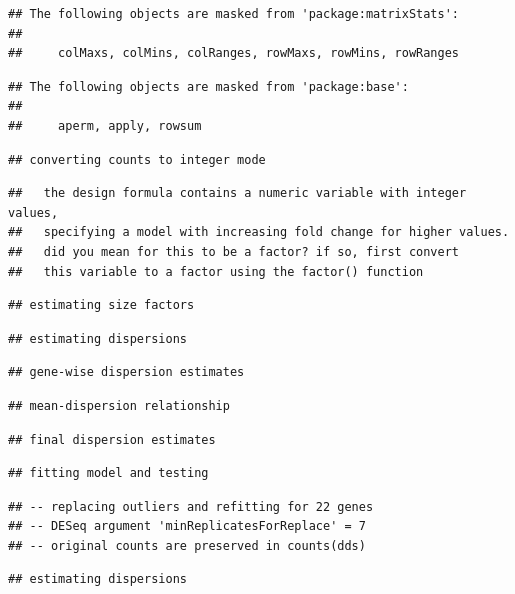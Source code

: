 \documentclass[]{article}
\begin{document}
\begin{verbatim}
## The following objects are masked from 'package:matrixStats':
## 
##     colMaxs, colMins, colRanges, rowMaxs, rowMins, rowRanges
\end{verbatim}

\begin{verbatim}
## The following objects are masked from 'package:base':
## 
##     aperm, apply, rowsum
\end{verbatim}

\begin{verbatim}
## converting counts to integer mode
\end{verbatim}

\begin{verbatim}
##   the design formula contains a numeric variable with integer values,
##   specifying a model with increasing fold change for higher values.
##   did you mean for this to be a factor? if so, first convert
##   this variable to a factor using the factor() function
\end{verbatim}

\begin{verbatim}
## estimating size factors
\end{verbatim}

\begin{verbatim}
## estimating dispersions
\end{verbatim}

\begin{verbatim}
## gene-wise dispersion estimates
\end{verbatim}

\begin{verbatim}
## mean-dispersion relationship
\end{verbatim}

\begin{verbatim}
## final dispersion estimates
\end{verbatim}

\begin{verbatim}
## fitting model and testing
\end{verbatim}

\begin{verbatim}
## -- replacing outliers and refitting for 22 genes
## -- DESeq argument 'minReplicatesForReplace' = 7 
## -- original counts are preserved in counts(dds)
\end{verbatim}

\begin{verbatim}
## estimating dispersions
\end{verbatim}
\end{document}
